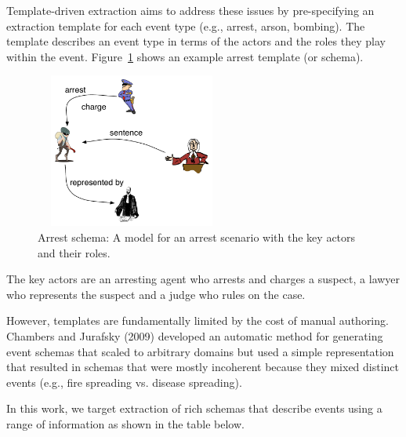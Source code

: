 Template-driven extraction aims to address these issues by pre-specifying an extraction template for each event type (e.g., arrest, arson, bombing). The template describes an event type in terms of the actors and the roles they play within the event. Figure~\ref{fig:arrest} shows an example arrest template (or schema).  
\begin{figure}
	\vspace{-2ex}
	\begin{center}
	\includegraphics[width=2.5in,height=2in]{figures/arrest-scenario} 	
	\caption{\label{fig:arrest} {Arrest schema: A model for an arrest scenario with the key actors and their roles.}}
	\end{center}
\end{figure}
The key actors are an arresting agent who arrests and charges a suspect, a lawyer who represents the suspect and a judge who rules on the case. 

However, templates are fundamentally limited by the cost of manual authoring. Chambers and Jurafsky (2009) developed an automatic method for generating event schemas that scaled to arbitrary domains but used a simple representation that resulted in schemas that were mostly incoherent because they mixed distinct events (e.g., fire spreading vs. disease spreading). 

In this work, we target extraction of rich schemas that describe events using a range of information as shown in the table below.

